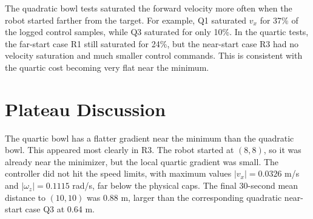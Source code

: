 \documentclass[11pt]{article}
\begin{document}
\begin{table}[H]
\centering
{}
\caption{Single-well quadratic and quartic results. Tail distance is the mean
distance to $(10,10)$ over the final 30 seconds of the run.}
\label{tab:single-well-results}
\end{table}

The quadratic bowl tests saturated the forward velocity more often when the
robot started farther from the target. For example, Q1 saturated $v_x$ for
37\% of the logged control samples, while Q3 saturated for only 10\%. In the
quartic tests, the far-start case R1 still saturated for 24\%, but the
near-start case R3 had no velocity saturation and much smaller control
commands. This is consistent with the quartic cost becoming very flat near the
minimum.

\section{Plateau Discussion}

The quartic bowl has a flatter gradient near the minimum than the quadratic
bowl. This appeared most clearly in R3. The robot started at $(8,8)$, so it was
already near the minimizer, but the local quartic gradient was small. The
controller did not hit the speed limits, with maximum values
$|v_x|=0.0326$ m/s and $|\omega_z|=0.1115$ rad/s, far below the physical caps.
The final 30-second mean distance to $(10,10)$ was 0.88 m, larger than the
corresponding quadratic near-start case Q3 at 0.64 m.
\end{document}
